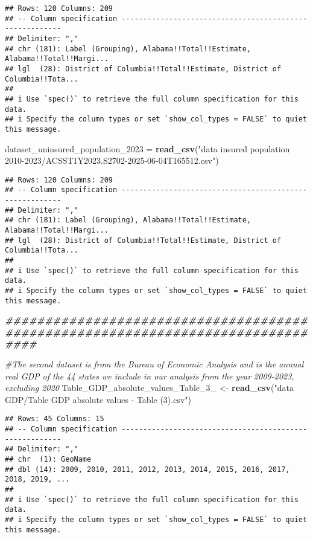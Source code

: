 \documentclass[
]{article}
\newenvironment{Shaded}{\begin{snugshade}}{\end{snugshade}}
\newcommand{\CommentTok}[1]{\textcolor[rgb]{0.56,0.35,0.01}{\textit{#1}}}
\newcommand{\DocumentationTok}[1]{\textcolor[rgb]{0.56,0.35,0.01}{\textbf{\textit{#1}}}}
\newcommand{\FunctionTok}[1]{\textcolor[rgb]{0.13,0.29,0.53}{\textbf{#1}}}
\newcommand{\NormalTok}[1]{#1}
\newcommand{\OtherTok}[1]{\textcolor[rgb]{0.56,0.35,0.01}{#1}}
\newcommand{\StringTok}[1]{\textcolor[rgb]{0.31,0.60,0.02}{#1}}
\begin{document}
\begin{verbatim}
## Rows: 120 Columns: 209
## -- Column specification --------------------------------------------------------
## Delimiter: ","
## chr (181): Label (Grouping), Alabama!!Total!!Estimate, Alabama!!Total!!Margi...
## lgl  (28): District of Columbia!!Total!!Estimate, District of Columbia!!Tota...
## 
## i Use `spec()` to retrieve the full column specification for this data.
## i Specify the column types or set `show_col_types = FALSE` to quiet this message.
\end{verbatim}

\begin{Shaded}
\begin{Highlighting}[]
\NormalTok{dataset\_uninsured\_population\_2023 }\OtherTok{=} \FunctionTok{read\_csv}\NormalTok{(}\StringTok{"data insured population 2010{-}2023/ACSST1Y2023.S2702{-}2025{-}06{-}04T165512.csv"}\NormalTok{)}
\end{Highlighting}
\end{Shaded}

\begin{verbatim}
## Rows: 120 Columns: 209
## -- Column specification --------------------------------------------------------
## Delimiter: ","
## chr (181): Label (Grouping), Alabama!!Total!!Estimate, Alabama!!Total!!Margi...
## lgl  (28): District of Columbia!!Total!!Estimate, District of Columbia!!Tota...
## 
## i Use `spec()` to retrieve the full column specification for this data.
## i Specify the column types or set `show_col_types = FALSE` to quiet this message.
\end{verbatim}

\begin{Shaded}
\begin{Highlighting}[]
\DocumentationTok{\#\#\#\#\#\#\#\#\#\#\#\#\#\#\#\#\#\#\#\#\#\#\#\#\#\#\#\#\#\#\#\#\#\#\#\#\#\#\#\#\#\#\#\#\#\#\#\#\#\#\#\#\#\#\#\#\#\#\#\#\#\#\#\#\#\#\#\#\#\#\#\#\#\#\#\#\#\#\#\#}

\CommentTok{\#The second dataset is from the Bureau of Economic Analysis and is the annual real GDP of the 44 states we include in our analysis from the year 2009{-}2023, excluding 2020}
\NormalTok{Table\_GDP\_absolute\_values\_Table\_3\_ }\OtherTok{\textless{}{-}} \FunctionTok{read\_csv}\NormalTok{(}\StringTok{"data GDP/Table GDP absolute values {-} Table (3).csv"}\NormalTok{)}
\end{Highlighting}
\end{Shaded}

\begin{verbatim}
## Rows: 45 Columns: 15
## -- Column specification --------------------------------------------------------
## Delimiter: ","
## chr  (1): GeoName
## dbl (14): 2009, 2010, 2011, 2012, 2013, 2014, 2015, 2016, 2017, 2018, 2019, ...
## 
## i Use `spec()` to retrieve the full column specification for this data.
## i Specify the column types or set `show_col_types = FALSE` to quiet this message.
\end{verbatim}
\end{document}

